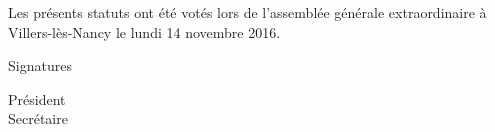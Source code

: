 \documentclass{article}
\begin{document}
	\vspace*{5cm}
	\begin{center}
		{\large\light{} Les présents statuts ont été votés lors de l’assemblée
		générale extraordinaire à Villers-lès-Nancy le lundi 14 novembre 2016.}
	\end{center}
    \vspace{3cm}
	Signatures\par
	\begin{multicols}{2}
	    \begin{center}
	        Président \\
	        Secrétaire
	    \end{center}
	\end{multicols}
    
\end{document}
